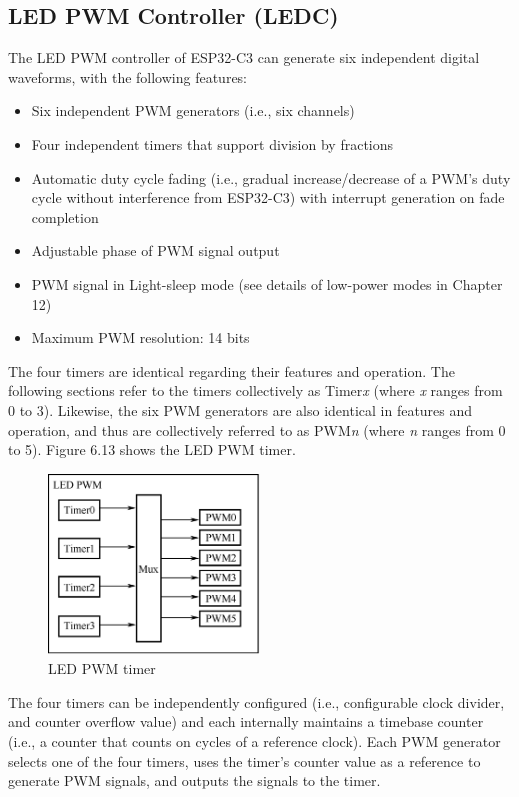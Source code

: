 \documentclass[a4paper,12pt,openany]{book}
\begin{document}
\subsection{LED PWM Controller (LEDC)}
The LED PWM controller of ESP32-C3 can generate six independent digital waveforms, with the following features:

\begin{itemize}[noitemsep]
    \item Six independent PWM generators (i.e., six channels)
    \item Four independent timers that support division by fractions
    \item Automatic duty cycle fading (i.e., gradual increase/decrease of a PWM’s duty cycle without interference from ESP32-C3) with interrupt generation on fade completion
    \item Adjustable phase of PWM signal output
    \item PWM signal in Light-sleep mode (see details of low-power modes in Chapter 12)
    \item Maximum PWM resolution: 14 bits
\end{itemize}

The four timers are identical regarding their features and operation. The following sections refer to the timers collectively as Timer\textit{x} (where \textit{x} ranges from 0 to 3). Likewise, the six PWM generators are also identical in features and operation, and thus are collectively referred to as PWM\textit{n} (where \textit{n} ranges from 0 to 5). Figure 6.13 shows the LED PWM timer.

\begin{figure}[h!]
    \centering
    \includegraphics[width=0.5\textwidth]{D6Z/6-13}
    \caption{LED PWM timer}
\end{figure}

The four timers can be independently configured (i.e., configurable clock divider, and counter overflow value) and each internally maintains a timebase counter (i.e., a counter that counts on cycles of a reference clock). Each PWM generator selects one of the four timers, uses the timer’s counter value as a reference to generate PWM signals, and outputs the signals to the timer.
\end{document}
